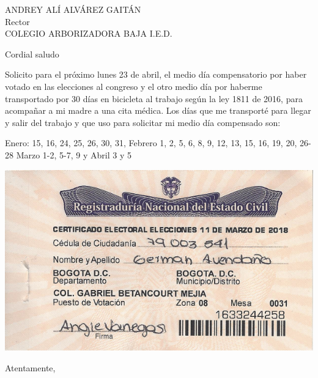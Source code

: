 \documentclass[letterpaper,spanish]{letter}
\date{20 de abril de 2018}
\begin{document}
\begin{letter}{ANDREY ALÍ ALVÁREZ GAITÁN\\Rector\\COLEGIO ARBORIZADORA BAJA I.E.D.}
	
\opening{Cordial saludo}
Solicito para el próximo lunes 23 de abril, el medio día compensatorio por haber votado en las elecciones al congreso y el otro medio día por haberme transportado por 30 días en bicicleta al trabajo según la ley 1811 de 2016, para acompañar a mi madre a una cita médica. Los días que me transporté para llegar y salir del trabajo y que uso para solicitar mi medio día compensado son:

Enero: 15, 16, 24, 25, 26, 30, 31, \; Febrero 1, 2, 5, 6, 8, 9, 12, 13, 15, 16, 19, 20, 26-28 \; Marzo 1-2, 5-7, 9 y Abril 3 y 5

\begin{center}
\includegraphics[scale=1]{Images/votaciones.pdf} 
\end{center}

\closing{Atentamente,}


\end{letter}
\end{document}
